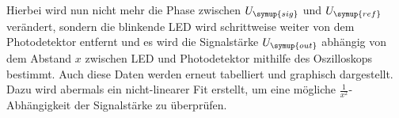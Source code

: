 Hierbei wird nun nicht mehr die Phase zwischen $U_{\symup{sig}}$ und $U_{\symup{ref}}$ verändert, sondern die blinkende LED 
wird schrittweise weiter von dem Photodetektor entfernt und es wird die Signalstärke $U_{\symup{out}}$ abhängig von dem 
Abstand $x$ zwischen LED und Photodetektor mithilfe des Oszilloskops bestimmt. Auch diese Daten werden erneut tabelliert und
graphisch dargestellt. Dazu wird abermals ein nicht-linearer Fit erstellt, um eine mögliche $\frac{1}{x^2}$-Abhängigkeit der
Signalstärke zu überprüfen.
